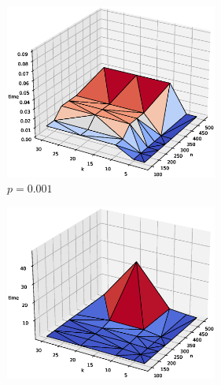 \begin{figure}[h!]
     \centering
     \begin{subfigure}[b]{\textwidth}
     	\centering
	     \begin{subfigure}[b]{0.32\textwidth}
	         \includegraphics[width=\columnwidth]{images/wsg3d1.eps}
	         \caption{$p=0.001$}
	     \end{subfigure}
	     \hspace{0em}
	     \begin{subfigure}[b]{0.32\textwidth}
	         \includegraphics[width=\columnwidth]{images/wsg3d2.eps}

\end{subfigure}
\end{subfigure}
\end{figure}
